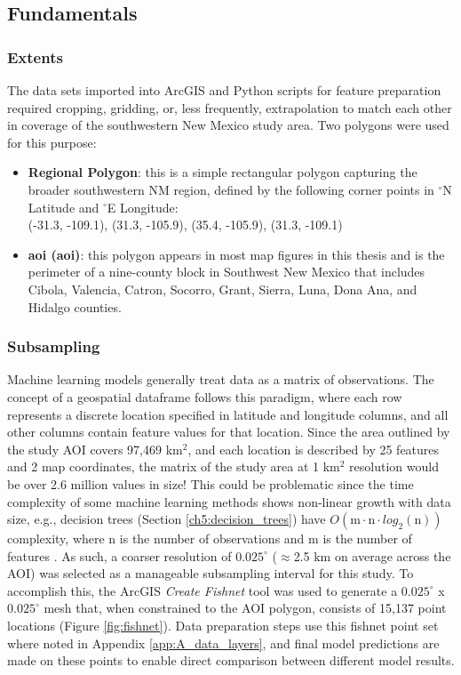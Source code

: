 \subsection{Fundamentals}\label{ch3:data_prep_fundamentals}
\subsubsection{Extents}\label{ch3:extents}
The data sets imported into ArcGIS and Python scripts for feature preparation required cropping, gridding, or, less frequently, extrapolation to match each other in coverage of the southwestern New Mexico study area. Two polygons were used for this purpose:

\begin{itemize}
\item \textbf{Regional Polygon}: this is a simple rectangular polygon capturing the broader southwestern NM region, defined by the following corner points in $^\circ$N Latitude and $^\circ$E Longitude: \\ (-31.3, -109.1), (31.3, -105.9), (35.4, -105.9), (31.3, -109.1)
\item \textbf{\acrlong{aoi} (\acrshort{aoi})}: this polygon appears in most map figures in this thesis and is the perimeter of a nine-county block in Southwest New Mexico that includes Cibola, Valencia, Catron, Socorro, Grant, Sierra, Luna, Dona Ana, and Hidalgo counties.
\end{itemize}

\subsubsection{Subsampling}
\label{ch3:fishnet}

Machine learning models generally treat data as a matrix of observations. The concept of a geospatial dataframe follows this paradigm, where each row represents a discrete location specified in latitude and longitude columns, and all other columns contain feature values for that location. Since the area outlined by the study AOI covers 97,469 km$^2$, and each location is described by 25 features and 2 map coordinates, the matrix of the study area at 1 km$^2$ resolution would be over 2.6 million values in size! This could be problematic since the time complexity of some machine learning methods shows non-linear growth with data size, e.g., decision trees (Section \ref{ch5:decision_trees}) have $O(\text{m} \cdot \text{n} \cdot log_2(\text{n}))$ complexity, where n is the number of observations and m is the number of features \citep{sani_computational_2018}. As such, a coarser resolution of $0.025^\circ$ ($\approx$2.5 km on average across the AOI) was selected as a manageable subsampling interval for this study. To accomplish this, the ArcGIS \textit{Create Fishnet} tool was used to generate a $0.025^\circ$ x $0.025^\circ$ mesh that, when constrained to the AOI polygon, consists of 15,137 point locations (Figure \ref{fig:fishnet}). Data preparation steps use this fishnet point set where noted in Appendix \ref{app:A_data_layers}, and final model predictions are made on these points to enable direct comparison between different model results. 

